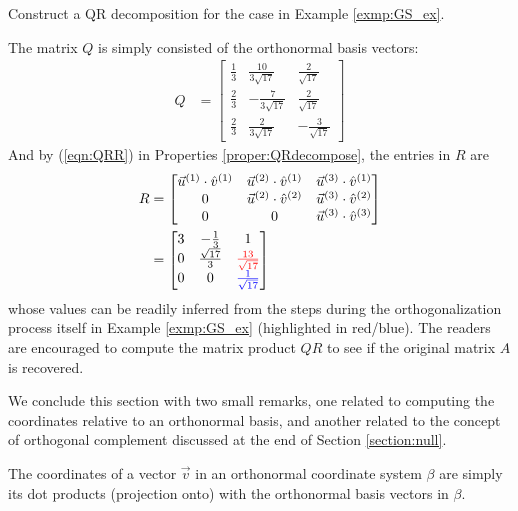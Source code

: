 \begin{exmp}
\label{exmp:QRdecom}
Construct a QR decomposition for the case in Example \ref{exmp:GS_ex}.
\end{exmp}
\begin{solution}
The matrix $Q$ is simply consisted of the orthonormal basis vectors:
\begin{align*}
Q &= 
\begin{bmatrix}
\frac{1}{3} & \frac{10}{3\sqrt{17}} & \frac{2}{\sqrt{17}} \\
\frac{2}{3} & -\frac{7}{3\sqrt{17}} & \frac{2}{\sqrt{17}} \\
\frac{2}{3} & \frac{2}{3\sqrt{17}} & -\frac{3}{\sqrt{17}}
\end{bmatrix}
\end{align*}
And by (\ref{eqn:QRR}) in Properties \ref{proper:QRdecompose}, the entries in $R$ are
\begin{align*}
R &= 
\begin{bmatrix}
\vec{u}^{(1)} \cdot \hat{v}^{(1)} & \vec{u}^{(2)} \cdot \hat{v}^{(1)} & \vec{u}^{(3)} \cdot \hat{v}^{(1)} \\
0 & \vec{u}^{(2)} \cdot \hat{v}^{(2)} & \vec{u}^{(3)} \cdot \hat{v}^{(2)} \\
0 & 0 & \vec{u}^{(3)} \cdot \hat{v}^{(3)}
\end{bmatrix}  \\
&= 
\begin{bmatrix}
3 & -\frac{1}{3} & 1 \\
0 & \frac{\sqrt{17}}{3} & \textcolor{red}{\frac{13}{\sqrt{17}}}  \\
0 & 0 & \textcolor{blue}{\frac{1}{\sqrt{17}}} \\
\end{bmatrix} 
\end{align*}
whose values can be readily inferred from the steps during the orthogonalization process itself in Example \ref{exmp:GS_ex} (highlighted in red/blue). The readers are encouraged to compute the matrix product $QR$ to see if the original matrix $A$ is recovered.
\end{solution}
We conclude this section with two small remarks, one related to computing the coordinates relative to an orthonormal basis, and another related to the concept of orthogonal complement discussed at the end of Section \ref{section:null}.
\begin{proper}
\label{proper:orthocoords}
The coordinates of a vector $\vec{v}$ in an orthonormal coordinate system $\beta$ are simply its dot products (projection onto) with the orthonormal basis vectors in $\beta$.
\end{proper}

